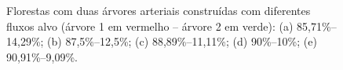 \begin{figure}[!htb]
  \centering \captiondelim{: }
  \caption{Florestas com duas árvores arteriais construídas com diferentes fluxos alvo (árvore 1 em vermelho -- árvore 2 em verde): 
  (a) 85,71\%--14,29\%; (b) 87,5\%--12,5\%;  (c) 88,89\%--11,11\%;  (d) 90\%--10\%;  (e) 90,91\%--9,09\%.}
  
  \hspace{12pt}


\end{figure}
